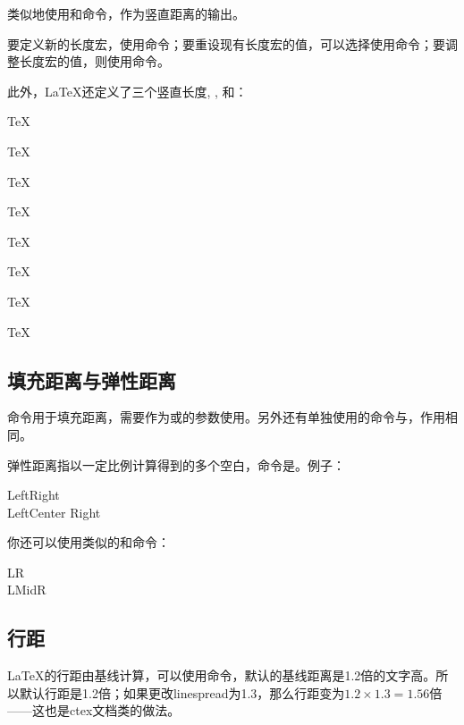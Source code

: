 类似地使用和命令，作为竖直距离的输出。

要定义新的长度宏，使用命令；要重设现有长度宏的值，可以选择使用命令；要调整长度宏的值，则使用命令。
\begin{latex}
\newlength{\mylatexlength}
\setlength{\mylatexlength}{10pt}
\addtolength{\mylatexlength}{-5pt}
\end{latex}

此外，\LaTeX 还定义了三个竖直长度, , 和：

\begin{codeshow}
\parbox[t]{3em}{TeX\par TeX}
\parbox[t]{3em}{TeX\par\smallskip TeX}
\parbox[t]{3em}{TeX\par\medskip TeX}
\parbox[t]{3em}{TeX\par\bigskip TeX}
\end{codeshow}

\subsection{填充距离与弹性距离}
命令用于填充距离，需要作为或的参数使用。另外还有单独使用的命令与，作用相同。

弹性距离指以一定比例计算得到的多个空白，命令是。例子：

\begin{codeshow}
Left\hspace{\fill}Right\\
LeftCenter
Right
\end{codeshow}

你还可以使用类似的和命令：

\begin{codeshow}
L\hfill R\\
L\hrulefill Mid\dotfill R
\end{codeshow}

\subsection{行距}
\LaTeX 的行距由基线计算，可以使用命令，默认的基线距离是1.2倍的文字高。所以默认行距是1.2倍；如果更改linespread为1.3，那么行距变为$1.2\times 1.3=1.56$倍——这也是ctex文档类的做法。

